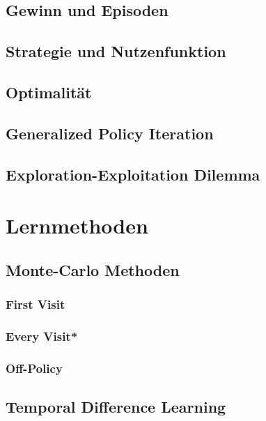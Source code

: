 \documentclass[12pt]{article}
\numberwithin{equation}{section}
\begin{document}
	\subsection{Gewinn und Episoden}
	

	\subsection{Strategie und Nutzenfunktion}
	

	\subsection{Optimalität}
	

	\subsection{Generalized Policy Iteration}
	
	
	\subsection{Exploration-Exploitation Dilemma}
	

\section{Lernmethoden}
	\subsection{Monte-Carlo Methoden}
	
		\subsubsection{First Visit}
		
		\pagebreak
		\subsubsection{Every Visit*}
		\subsubsection{Off-Policy}

	\subsection{Temporal Difference Learning}
	
\end{document}
